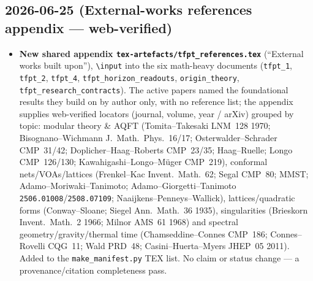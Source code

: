\subsection*{2026-06-25 (External-works references appendix --- web-verified)}
\begin{itemize}
\item \textbf{New shared appendix \texttt{tex-artefacts/tfpt\_references.tex}} (``External works built
upon''), \texttt{\textbackslash input} into the six math-heavy documents (\texttt{tfpt\_1},
\texttt{tfpt\_2}, \texttt{tfpt\_4}, \texttt{tfpt\_horizon\_readouts}, \texttt{origin\_theory},
\texttt{tfpt\_research\_contracts}). The active papers named the foundational results they build on by
author only, with no reference list; the appendix supplies web-verified locators (journal, volume, year /
arXiv) grouped by topic: modular theory \& AQFT (Tomita--Takesaki LNM~128 1970; Bisognano--Wichmann
J.~Math.\ Phys.\ 16/17; Osterwalder--Schrader CMP~31/42; Doplicher--Haag--Roberts CMP~23/35;
Haag--Ruelle; Longo CMP~126/130; Kawahigashi--Longo--M\"uger CMP~219), conformal nets/VOAs/lattices
(Frenkel--Kac Invent.~Math.~62; Segal CMP~80; MMST; Adamo--Moriwaki--Tanimoto; Adamo--Giorgetti--Tanimoto
\texttt{2506.01008}/\texttt{2508.07109}; Naaijkens--Penneys--Wallick), lattices/quadratic forms
(Conway--Sloane; Siegel Ann.~Math.~36 1935), singularities (Brieskorn Invent.~Math.~2 1966; Milnor AMS~61
1968) and spectral geometry/gravity/thermal time (Chamseddine--Connes CMP~186; Connes--Rovelli CQG~11;
Wald PRD~48; Casini--Huerta--Myers JHEP~05 2011). Added to the \texttt{make\_manifest.py} TEX list. No
claim or status change --- a provenance/citation completeness pass.
\end{itemize}

